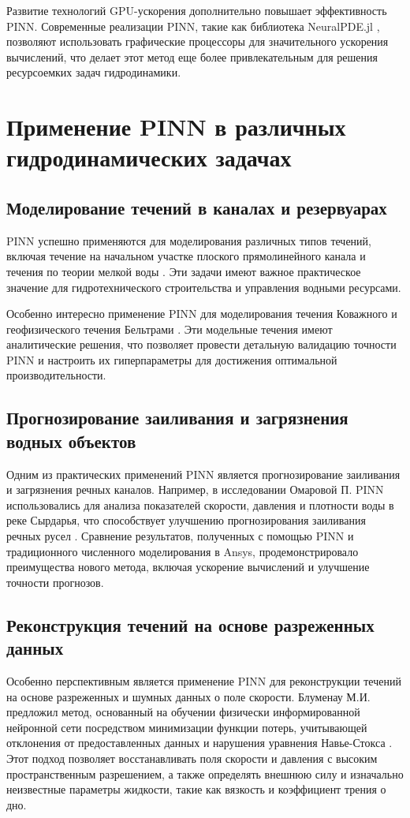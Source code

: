 Развитие технологий GPU-ускорения дополнительно повышает эффективность PINN. Современные реализации PINN, такие
как библиотека NeuralPDE.jl \cite{neuralpde2023}, позволяют использовать графические процессоры для значительного
ускорения вычислений, что делает этот метод еще более привлекательным для решения ресурсоемких задач гидродинамики.

\section{Применение PINN в различных гидродинамических задачах}
\subsection{Моделирование течений в каналах и резервуарах}
PINN успешно применяются для моделирования различных типов течений, включая течение на начальном участке плоского
прямолинейного канала и течения по теории мелкой воды \cite{fang2021high}. Эти задачи имеют важное практическое
значение для гидротехнического строительства и управления водными ресурсами.

Особенно интересно применение PINN для моделирования течения Коважного и геофизического течения
Бельтрами \cite{raissi2020hidden}. Эти модельные течения имеют аналитические решения, что позволяет провести
детальную валидацию точности PINN и настроить их гиперпараметры для достижения оптимальной производительности.

\subsection{Прогнозирование заиливания и загрязнения водных объектов}
Одним из практических применений PINN является прогнозирование заиливания и загрязнения речных каналов. Например,
в исследовании Омаровой П. PINN использовались для анализа показателей скорости, давления и плотности воды в реке
Сырдарья, что способствует улучшению прогнозирования заиливания речных русел \cite{omarova2022syrdarya}.
Сравнение результатов, полученных с помощью PINN и традиционного численного моделирования в Ansys, продемонстрировало
преимущества нового метода, включая ускорение вычислений и улучшение точности прогнозов.

\subsection{Реконструкция течений на основе разреженных данных}
Особенно перспективным является применение PINN для реконструкции течений на основе разреженных и шумных данных
о поле скорости. Блуменау М.И. предложил метод, основанный на обучении физически информированной нейронной сети
посредством минимизации функции потерь, учитывающей отклонения от предоставленных данных и нарушения уравнения
Навье-Стокса \cite{blumenau2021reconstruction}. Этот подход позволяет восстанавливать поля скорости и давления
с высоким пространственным разрешением, а также определять внешнюю силу и изначально неизвестные параметры
жидкости, такие как вязкость и коэффициент трения о дно.

